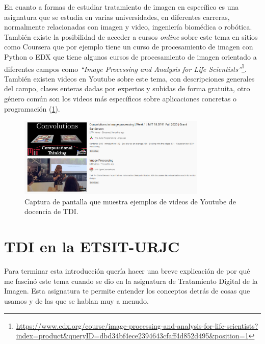 En cuanto a formas de estudiar tratamiento de imagen en específico es una asignatura que se estudia en varias universidades, en diferentes carreras, normalmente relacionadas con imagen y video, ingeniería biomédica o robótica. También existe la posibilidad de acceder a cursos \emph{online} sobre este tema en sitios como Coursera que por ejemplo tiene un curso de procesamiento de imagen con Python o EDX que tiene algunos cursos de procesamiento de imagen orientado a diferentes campos como \emph{``Image Processing and Analysis for Life Scientists''}\footnote{\url{https://www.edx.org/course/image-processing-and-analysis-for-life-scientists?index=product&queryID=dbd34bf4ece2394643cfaff4d852d495&position=1}}. También existen videos en Youtube sobre este tema, con descripciones generales del campo, clases enteras dadas por expertos y subidas de forma gratuita, otro género común son los videos más específicos sobre aplicaciones concretas o programación (\ref{youtube}).\\

\begin{figure}[h]
\centering
\includegraphics[width=0.8\textwidth]{imagenes/youtube.PNG}
\caption{Captura de pantalla que muestra ejemplos de videos de Youtube de docencia de TDI.}
\label{youtube}
\end{figure}

\section{TDI en la ETSIT-URJC}

Para terminar esta introducción quería hacer una breve explicación de por qué me fascinó este tema cuando se dio en la asignatura de Tratamiento Digital de la Imagen. Esta asignatura te permite entender los conceptos detrás de cosas que usamos y de las que se hablan muy a menudo.\\

